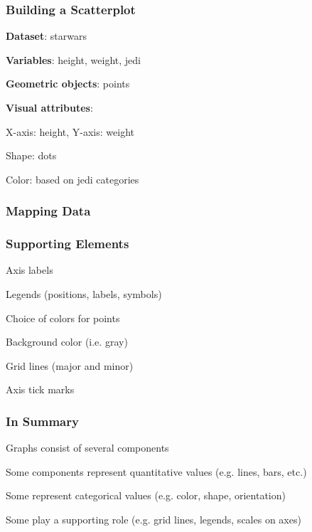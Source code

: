 \documentclass[12pt]{beamer}\usepackage[]{graphicx}\usepackage[]{color}
\begin{document}
\begin{frame}
\frametitle{Building a Scatterplot}

\bbi
  \item \textbf{Dataset}: starwars
  \item \textbf{Variables}: height, weight, jedi
  \item \textbf{Geometric objects}: points
  \item \textbf{Visual attributes}:
  \bi
    \item X-axis: height, Y-axis: weight
    \item Shape: dots
    \item Color: based on jedi categories
  \ei
\ei

\end{frame}


\begin{frame}
\frametitle{Mapping Data}
\begin{center}
\end{center}
\end{frame}


\begin{frame}
\frametitle{Supporting Elements}

\bbi
  \item Axis labels
  \item Legends (positions, labels, symbols)
  \item Choice of colors for points
  \item Background color (i.e. gray)
  \item Grid lines (major and minor)
  \item Axis tick marks
\ei

\end{frame}


\begin{frame}
\frametitle{In Summary}

\bbi
  \item Graphs consist of several components
  \item Some components represent quantitative values (e.g. lines, bars, etc.)
  \item Some represent categorical values (e.g. color, shape, orientation)
  \item Some play a supporting role (e.g. grid lines, legends, scales on axes)
\ei

\end{frame}
\end{document}

